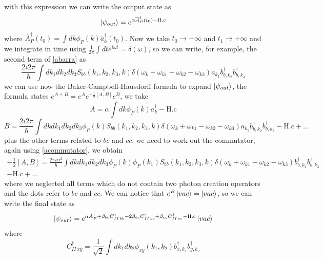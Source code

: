 with this expression we can write the output state as
\begin{equation}\ket{\psi_{out}} = e^{\alpha \overline{A}_P^\dagger(t_0)-\text{H.c}}\end{equation}
where $\overline{A}_P^\dagger(t_0) = \int dk \phi_P(k)\overline{a}_k^\dagger(t_0)$. Now we take $t_0\to -\infty$ and $t_1 \to +\infty$ and we integrate in time using $\frac{1}{2\pi} \int dt e^{i\omega t} = \delta(\omega)$, so we can write, for example, the second term of \eqref{abarra} as
\begin{equation}\frac{2i2\pi }{\hbar}\int dk_1dk_2 dk_3S_{bb}(k_1,k_2,k_3,k)\delta(\omega_{k}+\omega_{k1}-\omega_{k2}-\omega_{k3})a_{k_1}b_{b,k_2}^\dagger b_{b,k_3}^\dagger \end{equation}
we can use now the Baker-Campbell-Hausdorff formula to expand $\ket{\psi_{out}}$, the formula states $e^{A+B} = e^{A}e^{-\frac{1}{2}[A,B]} e^{B}$, we take 
\begin{equation}A =\alpha \int dk \phi_P(k)a_k^\dagger - \text{H.c} \end{equation}
\begin{equation}B = \frac{2i2\pi }{\hbar}\int dk dk_1dk_2 dk_3\phi_P(k)S_{bb}(k_1,k_2,k_3,k)\delta(\omega_{k}+\omega_{k1}-\omega_{k2}-\omega_{k3})a_{k_1}b_{b,k_2}^\dagger b_{b,k_3}^\dagger -\text{H.c} +\dots\end{equation}
plus the other terms related to $bc$ and $cc$, we need to work out the commutator, again using \eqref{acommutator}, we obtain
\begin{multline}-\frac{1}{2}[A,B] = \frac{2\pi i \alpha^2}{\hbar}\int dk dk_1dk_2 dk_3\phi_P(k)\phi_P(k_1)S_{bb}(k_1,k_2,k_3,k)\delta(\omega_{k}+\omega_{k1}-\omega_{k2}-\omega_{k3})b_{b,k_2}^\dagger b_{b,k_3}^\dagger \\ -\text{H.c} +\dots\end{multline}
where we neglected all terms which do not contain two photon creation operators and the dots refer to $bc$ and $cc$. We can notice that $e^B\ket{vac} = \ket{vac}$, so we can write the final state as
\begin{equation}\ket{\psi_{out}} = e^{\alpha A_P^\dagger + \beta_{bb} C^\dagger_{II\,bb}+ 2\beta_{bc} C^\dagger_{II\,bc}+ \beta_{cc} C^\dagger_{II\,cc}-\text{H.c}}\ket{vac}\end{equation}
where
\begin{equation}C^\dagger_{II\, xy} = \frac{1}{\sqrt{2}}\int dk_1 dk_2 \phi_{xy}(k_1,k_2)b_{x,k_1}^\dagger b_{y,k_2}^\dagger \end{equation}
